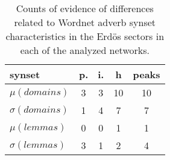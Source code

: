 \begin{table}[h!]
\begin{center}
\begin{tabular}{| l | c | c | c | c |}\hline
synset & p. & i. & h & peaks \\\hline
$\mu(domains)$ & 3  & 3  & 10  & 10 \\\hline
$\sigma(domains)$ & 1  & 4  & 7  & 7 \\\hline
$\mu(lemmas)$ & 0  & 0  & 1  & 1 \\\hline
$\sigma(lemmas)$ & 3  & 1  & 2  & 4 \\\hline
\end{tabular}
\caption{Counts of evidence of differences related to Wordnet adverb synset characteristics in the Erd\"os sectors in each of the analyzed networks.}
\end{center}
\end{table}